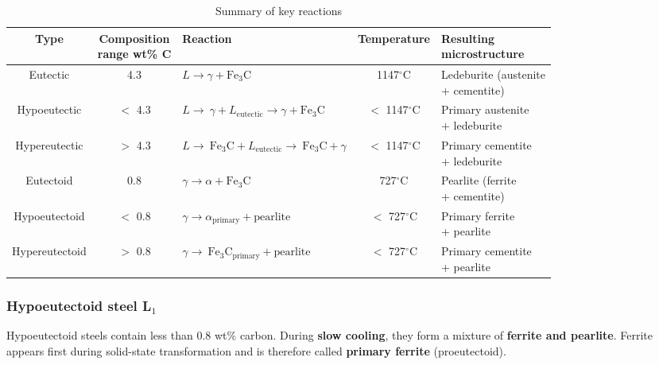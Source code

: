 \documentclass{article}
\begin{document}
{
  \renewcommand{\arraystretch}{2}
  \begin{table}[ht!]
    \centering
    \caption*{Summary of key reactions}
    \begin{tabular}{|c|c|l|c|l|}
      \hline \textbf{Type} & \thead{\textbf{Composition}\\\textbf{range wt\% C}} & \textbf{Reaction} & \textbf{Temperature} & \thead{\textbf{Resulting}\\\textbf{microstructure}}\\
      \hline Eutectic & 4.3 & $L \to \gamma + \mathrm{Fe}_3\mathrm{C}$ & 1147$^\circ$C & \makecell[l]{Ledeburite (austenite\\+ cementite)}\\
      \hline Hypoeutectic & $<$ 4.3 & $L \to\ \gamma + L_\text{eutectic} \to \gamma + \mathrm{Fe}_3\mathrm{C}$ & $<$ 1147$^\circ$C & \makecell[l]{Primary austenite\\+ ledeburite}\\
      \hline Hypereutectic & $>$ 4.3 & $L \to\ \mathrm{Fe}_3\mathrm{C} + L_\text{eutectic} \to\ \mathrm{Fe}_3\mathrm{C} + \gamma$ & $<$ 1147$^\circ$C & \makecell[l]{Primary cementite\\+ ledeburite}\\
      \hline Eutectoid & 0.8 & $\gamma \to \alpha + \mathrm{Fe}_3\mathrm{C}$ & 727$^\circ$C & \makecell[l]{Pearlite (ferrite\\+ cementite)}\\
      \hline Hypoeutectoid & $<$ 0.8 & $\gamma \to \alpha_\text{primary} + \text{pearlite}$ & $<$ 727$^\circ$C & \makecell[l]{Primary ferrite\\+ pearlite}\\
      \hline Hypereutectoid & $>$ 0.8 & $\gamma \to\ \mathrm{Fe}_3\mathrm{C}_\text{primary} + \text{pearlite}$ & $<$ 727$^\circ$C & \makecell[l]{Primary cementite\\+ pearlite}\\
      \hline 
    \end{tabular}
  \end{table}
}

\subsubsection{Hypoeutectoid steel L$_1$}
Hypoeutectoid steels contain less than 0.8 wt\% carbon. During \textbf{slow cooling},
they form a mixture of \textbf{ferrite and pearlite}. Ferrite appears first during
solid-state transformation and is therefore called \textbf{primary ferrite} (proeutectoid).
\end{document}
